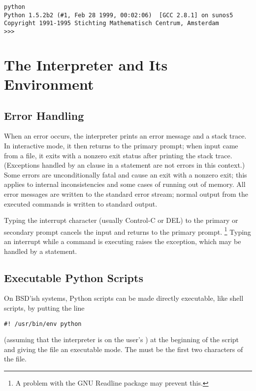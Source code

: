 \documentclass{manual}
\begin{document}
\begin{verbatim}
python
Python 1.5.2b2 (#1, Feb 28 1999, 00:02:06)  [GCC 2.8.1] on sunos5
Copyright 1991-1995 Stichting Mathematisch Centrum, Amsterdam
>>>
\end{verbatim}

\section{The Interpreter and Its Environment \label{interp}}

\subsection{Error Handling \label{error}}

When an error occurs, the interpreter prints an error
message and a stack trace.  In interactive mode, it then returns to
the primary prompt; when input came from a file, it exits with a
nonzero exit status after printing
the stack trace.  (Exceptions handled by an  clause in a
 statement are not errors in this context.)  Some errors are
unconditionally fatal and cause an exit with a nonzero exit; this
applies to internal inconsistencies and some cases of running out of
memory.  All error messages are written to the standard error stream;
normal output from the executed commands is written to standard
output.

Typing the interrupt character (usually Control-C or DEL) to the
primary or secondary prompt cancels the input and returns to the
primary prompt.%
\footnote{
        A problem with the GNU Readline package may prevent this.
}
Typing an interrupt while a command is executing raises the
 exception, which may be handled by a
 statement.

\subsection{Executable Python Scripts \label{scripts}}

On BSD'ish \UNIX{} systems, Python scripts can be made directly
executable, like shell scripts, by putting the line

\begin{verbatim}
#! /usr/bin/env python
\end{verbatim}

(assuming that the interpreter is on the user's ) at the
beginning of the script and giving the file an executable mode.  The
\samp{\#!} must be the first two characters of the file.
\end{document}
